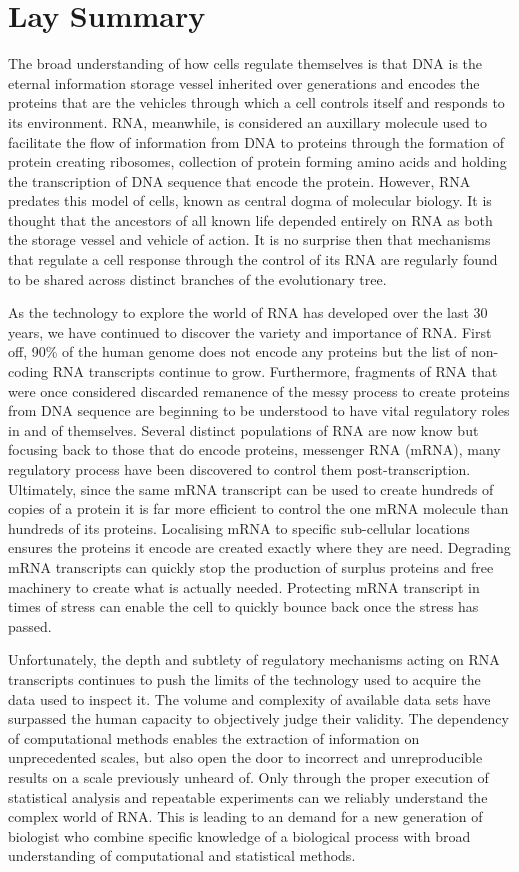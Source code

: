 \documentclass[../main.tex]{subfiles}
\begin{document}
\chapter{Lay Summary}
The broad understanding of how cells regulate themselves is that DNA is the eternal information storage vessel inherited over generations and encodes the proteins that are the vehicles through which a cell controls itself and responds to its environment. RNA, meanwhile, is considered an auxillary molecule used to facilitate the flow of information from DNA to proteins through the formation of protein creating ribosomes, collection of protein forming amino acids and holding the transcription of DNA sequence that encode the protein. However, RNA predates this model of cells, known as central dogma of molecular biology. It is thought that the ancestors of all known life depended entirely on RNA as both the storage vessel and vehicle of action. It is no surprise then that mechanisms that regulate a cell response through the control of its RNA are regularly found to be shared across distinct branches of the evolutionary tree. 

As the technology to explore the world of RNA has developed over the last 30 years, we have continued to discover the variety and importance of RNA. First off, 90\% of the human genome does not encode any proteins but the list of non-coding RNA transcripts continue to grow. Furthermore, fragments of RNA that were once considered discarded remanence of the messy process to create proteins from DNA sequence are beginning to be understood to have vital regulatory roles in and of themselves. Several distinct populations of RNA are now know but focusing back to those that do encode proteins, messenger RNA (mRNA), many regulatory process have been discovered to control them post-transcription. Ultimately, since the same mRNA transcript can be used to create hundreds of copies of a protein it is far more efficient to control the one mRNA molecule than hundreds of its proteins. Localising mRNA to specific sub-cellular locations ensures the proteins it encode are created exactly where they are need. Degrading mRNA transcripts can quickly stop the production of surplus proteins and free machinery to create what is actually needed. Protecting mRNA transcript in times of stress can enable the cell to quickly bounce back once the stress has passed. 

Unfortunately, the depth and subtlety of regulatory mechanisms acting on RNA transcripts continues to push the limits of the technology used to acquire the data used to inspect it. The volume and complexity of available data sets have surpassed the human capacity to objectively judge their validity. The dependency of computational methods enables the extraction of information on unprecedented scales, but also open the door to incorrect and unreproducible results on a scale previously unheard of. Only through the proper execution of statistical analysis and repeatable experiments can we reliably understand the complex world of RNA. This is leading to an demand for a new generation of biologist who combine specific knowledge of a biological process with broad understanding of computational and statistical methods.
\end{document}
